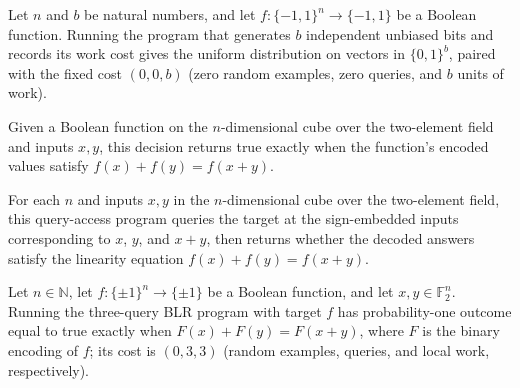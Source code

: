 \begin{theorem}
\label{FABL.runWithCost_randomBitVectorProgram}
\leanok
{}
Let $n$ and $b$ be natural numbers, and let $f:\{−1,1\}^{n}\to\{−1,1\}$ be a Boolean
function. Running the program that generates $b$ independent unbiased bits and records
its work cost gives the uniform distribution on vectors in $\{0,1\}^{b}$, paired with
the fixed cost $(0,0,b)$ (zero random examples, zero queries, and $b$ units of work).
\end{theorem}

\begin{definition}
\label{FABL.derandomizedBLRDecision}
\leanok
{}
Given a Boolean function on the $n$-dimensional cube over the two-element field and
inputs $x,y$, this decision returns true exactly when the function's encoded values
satisfy $f(x)+f(y)=f(x+y)$.
\end{definition}

\begin{definition}
\label{FABL.derandomizedBLRQueryProgram}
\leanok
{}
For each $n$ and inputs $x,y$ in the $n$-dimensional cube over the two-element field,
this query-access program queries the target at the sign-embedded inputs corresponding
to $x$, $y$, and $x+y$, then returns whether the decoded answers satisfy the linearity
equation $f(x)+f(y)=f(x+y)$.
\end{definition}

\begin{theorem}
\label{FABL.runWithCost_derandomizedBLRQueryProgram}
\leanok
{}
Let $n\in\mathbb{N}$, let $f:\{\pm1\}^n\to\{\pm1\}$ be a Boolean function, and let
$x,y\in\mathbb{F}_2^n$. Running the three-query BLR program with target $f$ has
probability-one outcome equal to true exactly when $F(x)+F(y)=F(x+y)$, where $F$ is the
binary encoding of $f$; its cost is $(0,3,3)$ (random examples, queries, and local work,
respectively).
\end{theorem}

